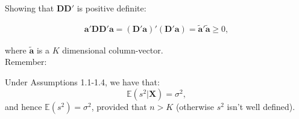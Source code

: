 \documentclass[]{book}
\theoremstyle{definition}
\theoremstyle{definition}
\theoremstyle{definition}
\theoremstyle{remark}
\let\BeginKnitrBlock\begin \let\EndKnitrBlock\end
\begin{document}
Showing that \(\mathbf{D}\mathbf{D}'\) is positive definite:

\[
\begin{align*}
  \mathbf{a}'\mathbf{D}\mathbf{D}'\mathbf{a}=(\mathbf{D}'\mathbf{a})'(\mathbf{D}'\mathbf{a})=\tilde{\mathbf{a}}'\tilde{\mathbf{a}}\geq 0,
\end{align*}
\]

where \(\tilde{\mathbf{a}}\) is a \(K\) dimensional column-vector.\\
Remember:


\BeginKnitrBlock{theorem}[Unbiasedness of $s^2$]
\protect\hypertarget{thm:UBS}{}{\label{thm:UBS} {} }Under Assumptions 1.1-1.4, we have that: \[\mathbb{E}(s^2|\mathbf{X})=\sigma^2,\] and
hence \(\mathbb{E}(s^2)=\sigma^2\), provided that \(n>K\) (otherwise \(s^2\) isn't
well defined).
\EndKnitrBlock{theorem}
\end{document}

